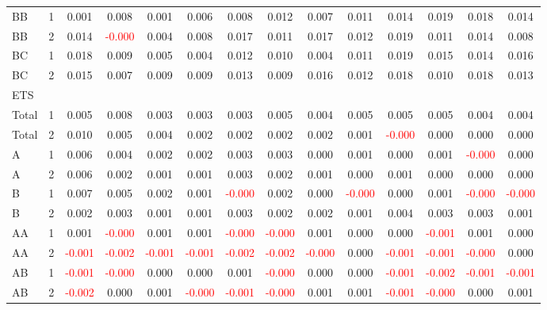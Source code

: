 \begin{table}[!htb]
{\begin{tabular}{llcccccccccccc}
BB & 1 & 0.001 & 0.008 & 0.001 & 0.006 & 0.008 & 0.012 & 0.007 & 0.011 & 0.014 & 0.019 & 0.018 & 0.014\\
BB & 2 & 0.014 & \textcolor{red}{-0.000} & 0.004 & 0.008 & 0.017 & 0.011 & 0.017 & 0.012 & 0.019 & 0.011 & 0.014 & 0.008\\
BC & 1 & 0.018 & 0.009 & 0.005 & 0.004 & 0.012 & 0.010 & 0.004 & 0.011 & 0.019 & 0.015 & 0.014 & 0.016\\
BC & 2 & 0.015 & 0.007 & 0.009 & 0.009 & 0.013 & 0.009 & 0.016 & 0.012 & 0.018 & 0.010 & 0.018 & 0.013\\
\hline
ETS &  &  &  &  &  &  &  &  &  &  &  &  & \\
\hline
Total & 1 & 0.005 & 0.008 & 0.003 & 0.003 & 0.003 & 0.005 & 0.004 & 0.005 & 0.005 & 0.005 & 0.004 & 0.004\\
Total & 2 & 0.010 & 0.005 & 0.004 & 0.002 & 0.002 & 0.002 & 0.002 & 0.001 & \textcolor{red}{-0.000} & 0.000 & 0.000 & 0.000\\
A & 1 & 0.006 & 0.004 & 0.002 & 0.002 & 0.003 & 0.003 & 0.000 & 0.001 & 0.000 & 0.001 & \textcolor{red}{-0.000} & 0.000\\
A & 2 & 0.006 & 0.002 & 0.001 & 0.001 & 0.003 & 0.002 & 0.001 & 0.000 & 0.001 & 0.000 & 0.000 & 0.000\\
B & 1 & 0.007 & 0.005 & 0.002 & 0.001 & \textcolor{red}{-0.000} & 0.002 & 0.000 & \textcolor{red}{-0.000} & 0.000 & 0.001 & \textcolor{red}{-0.000} & \textcolor{red}{-0.000}\\
B & 2 & 0.002 & 0.003 & 0.001 & 0.001 & 0.003 & 0.002 & 0.002 & 0.001 & 0.004 & 0.003 & 0.003 & 0.001\\
AA & 1 & 0.001 & \textcolor{red}{-0.000} & 0.001 & 0.001 & \textcolor{red}{-0.000} & \textcolor{red}{-0.000} & 0.001 & 0.000 & 0.000 & \textcolor{red}{-0.001} & 0.001 & 0.000\\
AA & 2 & \textcolor{red}{-0.001} & \textcolor{red}{-0.002} & \textcolor{red}{-0.001} & \textcolor{red}{-0.001} & \textcolor{red}{-0.002} & \textcolor{red}{-0.002} & \textcolor{red}{-0.000} & 0.000 & \textcolor{red}{-0.001} & \textcolor{red}{-0.001} & \textcolor{red}{-0.000} & 0.000\\
AB & 1 & \textcolor{red}{-0.001} & \textcolor{red}{-0.000} & 0.000 & 0.000 & 0.001 & \textcolor{red}{-0.000} & 0.000 & 0.000 & \textcolor{red}{-0.001} & \textcolor{red}{-0.002} & \textcolor{red}{-0.001} & \textcolor{red}{-0.001}\\
AB & 2 & \textcolor{red}{-0.002} & 0.000 & 0.001 & \textcolor{red}{-0.000} & \textcolor{red}{-0.001} & \textcolor{red}{-0.000} & 0.001 & 0.001 & \textcolor{red}{-0.001} & \textcolor{red}{-0.000} & 0.000 & 0.001\\

\end{tabular}}
\end{table}
